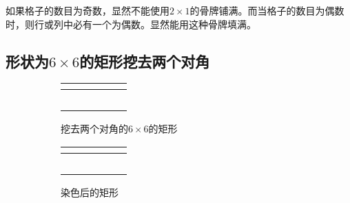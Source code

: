 如果格子的数目为奇数，显然不能使用$2\times1$的骨牌铺满。而当格子的数目为偶数时，则行或列中必有一个为偶数。显然能用这种骨牌填满。
\subsection{形状为$6\times6$的矩形挖去两个对角}\label{subsec:tiling-2-2}
\begin{figure}[ht!]
	\begin{subfigure}{0.5\textwidth}
		\centering
		\begin{tabular}{|c|c|c|c|c|c|}
			\cline{2-6}
			\multicolumn{1}{c|}{} &  &  &  &  &                      \\ \hline
			                      &  &  &  &  &                      \\ \hline
			                      &  &  &  &  &                      \\ \hline
			                      &  &  &  &  &                      \\ \hline
			                      &  &  &  &  &                      \\ \hline
			                      &  &  &  &  & \multicolumn{1}{c}{} \\
			\cline{1-5}
		\end{tabular}
		\caption{挖去两个对角的$6\times6$的矩形}\label{fig:tiling-3}
	\end{subfigure}
	\begin{subfigure}{0.5\textwidth}
		\centering
		\begin{tabular}{|c|c|c|c|c|c|}
			\cline{2-6}
			\multicolumn{1}{c|}{}  & \cellcolor[rgb]{0,0,0} &                        & \cellcolor[rgb]{0,0,0} &                        & \cellcolor[rgb]{0,0,0} \\ \hline
			\cellcolor[rgb]{0,0,0} &                        & \cellcolor[rgb]{0,0,0} &                        & \cellcolor[rgb]{0,0,0} &                        \\ \hline
			                       & \cellcolor[rgb]{0,0,0} &                        & \cellcolor[rgb]{0,0,0} &                        & \cellcolor[rgb]{0,0,0} \\ \hline
			\cellcolor[rgb]{0,0,0} &                        & \cellcolor[rgb]{0,0,0} &                        & \cellcolor[rgb]{0,0,0} &                        \\ \hline
			                       & \cellcolor[rgb]{0,0,0} &                        & \cellcolor[rgb]{0,0,0} &                        & \cellcolor[rgb]{0,0,0} \\ \hline
			\cellcolor[rgb]{0,0,0} &                        & \cellcolor[rgb]{0,0,0} &                        & \cellcolor[rgb]{0,0,0} & \multicolumn{1}{c}{}   \\
			\cline{1-5}
		\end{tabular}
		\caption{染色后的矩形}\label{fig:tiling-4}
	\end{subfigure}
	\caption{}
\end{figure}
